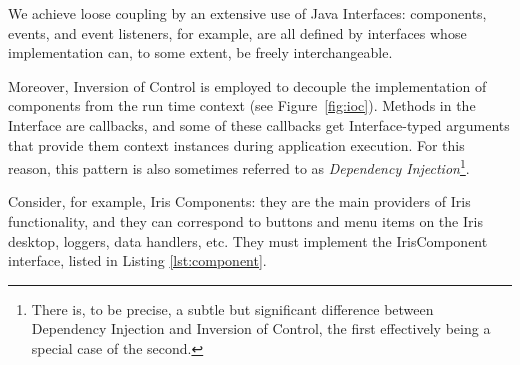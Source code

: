\documentclass[final,5p,authoryear]{elsarticle}
\begin{document}
We achieve loose coupling by an extensive use of Java Interfaces: components,
events, and event listeners, for example, are all defined by interfaces whose
implementation can, to some extent, be freely interchangeable.

Moreover, Inversion of Control is employed to decouple
the implementation of components from the run time context (see Figure~\ref{fig:ioc}). 
Methods in the
Interface are callbacks, and some of these callbacks get Interface-typed
arguments that provide them context instances during application execution.
For this reason, this pattern is also sometimes referred to as \emph{Dependency
Injection}\footnote{There is, to be precise, a subtle but significant difference
between Dependency Injection and Inversion of Control, the first effectively
being a special case of the second.}.

Consider, for example, Iris Components: they are the main providers of Iris
functionality, and they can correspond to buttons and menu items on the Iris
desktop, loggers, data handlers, etc. They must implement the IrisComponent
interface, listed in Listing \ref{lst:component}.
\end{document}
